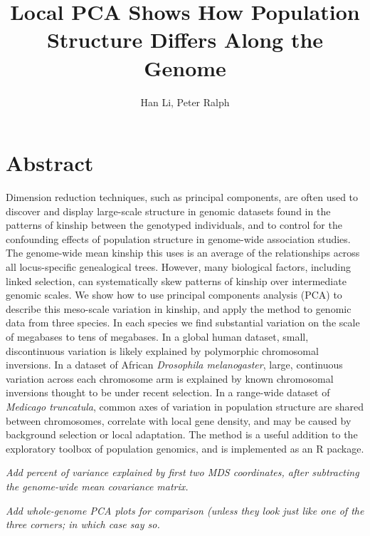 \documentclass[11pt, oneside]{article}   	%
\title{Local PCA Shows How Population Structure Differs Along the Genome}
\author{Han Li, Peter Ralph}
\newcommand{\plr}[1]{{\em \color{blue} #1}}
\begin{document}
\maketitle
\doublespacing


\section*{Abstract}

Dimension reduction techniques,
such as principal components,
are often used to discover and display large-scale structure in genomic datasets
found in the patterns of kinship
between the genotyped individuals,
and to control for the confounding effects of population structure in genome-wide association studies.
The genome-wide mean kinship this uses
is an average of the relationships across all locus-specific genealogical trees.
However, many biological factors,
including linked selection,
can systematically skew patterns of kinship over intermediate genomic scales.
We show how to use principal components analysis (PCA) to describe this meso-scale variation in kinship,
and apply the method to genomic data from three species.
In each species we find substantial variation on the scale of megabases to tens of megabases.
In a global human dataset, small, discontinuous variation is likely explained by polymorphic chromosomal inversions.
In a dataset of African \textit{Drosophila melanogaster}, large, continuous variation across each chromosome arm
is explained by known chromosomal inversions thought to be under recent selection.
In a range-wide dataset of \textit{Medicago truncatula},
common axes of variation in population structure are shared between chromosomes,
correlate with local gene density,
and may be caused by background selection or local adaptation.
The method is a useful addition to the exploratory toolbox
of population genomics,
and is implemented as an R package.

\plr{Add percent of variance explained by first two MDS coordinates, after subtracting the genome-wide mean covariance matrix.}

\plr{Add whole-genome PCA plots for comparison (unless they look just like one of the three corners; in which case say so.}
\end{document}
